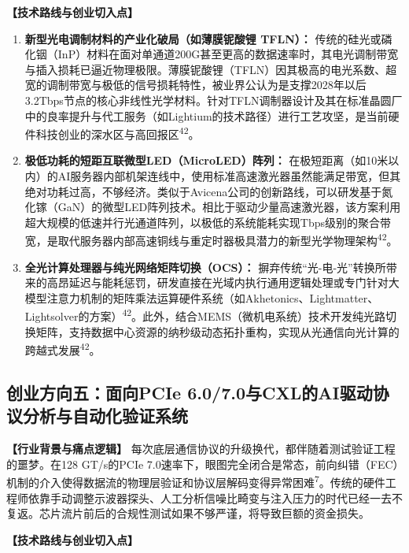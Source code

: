\textbf{【技术路线与创业切入点】}

\begin{enumerate}
  \item \textbf{新型光电调制材料的产业化破局（如薄膜铌酸锂 TFLN）：} 传统的硅光或磷化铟（InP）材料在面对单通道200G甚至更高的数据速率时，其电光调制带宽与插入损耗已逼近物理极限。薄膜铌酸锂（TFLN）因其极高的电光系数、超宽的调制带宽与极低的信号损耗特性，被业界公认为是支撑2028年以后3.2Tbps节点的核心非线性光学材料。针对TFLN调制器设计及其在标准晶圆厂中的良率提升与代工服务（如Lightium的技术路径）进行工艺攻坚，是当前硬件科技创业的深水区与高回报区\textsuperscript{42}。
  \item \textbf{极低功耗的短距互联微型LED（MicroLED）阵列：} 在极短距离（如10米以内）的AI服务器内部机架连线中，使用标准高速激光器虽然能满足带宽，但其绝对功耗过高，不够经济。类似于Avicena公司的创新路线，可以研发基于氮化镓（GaN）的微型LED阵列技术。相比于驱动少量高速激光器，该方案利用超大规模的低速并行光通道阵列，以极低的系统能耗实现Tbps级别的聚合带宽，是取代服务器内部高速铜线与重定时器极具潜力的新型光学物理架构\textsuperscript{42}。
  \item \textbf{全光计算处理器与纯光网络矩阵切换（OCS）：} 摒弃传统``光-电-光''转换所带来的高昂延迟与能耗惩罚，研发直接在光域内执行通用逻辑处理或专门针对大模型注意力机制的矩阵乘法运算硬件系统（如Akhetonics、Lightmatter、Lightsolver的方案）\textsuperscript{42}。此外，结合MEMS（微机电系统）技术开发纯光路切换矩阵，支持数据中心资源的纳秒级动态拓扑重构，实现从光通信向光计算的跨越式发展\textsuperscript{42}。
\end{enumerate}

\subsection{创业方向五：面向PCIe 6.0/7.0与CXL的AI驱动协议分析与自动化验证系统}

\textbf{【行业背景与痛点逻辑】} 每次底层通信协议的升级换代，都伴随着测试验证工程的噩梦。在128 GT/s的PCIe 7.0速率下，眼图完全闭合是常态，前向纠错（FEC）机制的介入使得数据流的物理层验证和协议层解码变得异常困难\textsuperscript{7}。传统的硬件工程师依靠手动调整示波器探头、人工分析信噪比畸变与注入压力的时代已经一去不复返。芯片流片前后的合规性测试如果不够严谨，将导致巨额的资金损失。

\textbf{【技术路线与创业切入点】}

